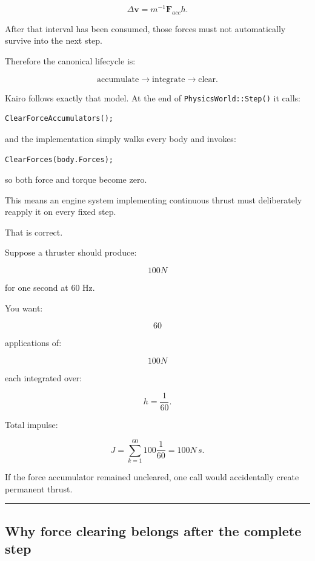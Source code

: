 \[
\Delta\mathbf v
=
m^{-1}\mathbf F_{acc}h.
\]

After that interval has been consumed, those forces must not automatically survive into the next step.

Therefore the canonical lifecycle is:

\[
\boxed{
\text{accumulate}
\rightarrow
\text{integrate}
\rightarrow
\text{clear}.
}
\]

Kairo follows exactly that model. At the end of \texttt{PhysicsWorld::Step()} it calls:

\begin{verbatim}
ClearForceAccumulators();
\end{verbatim}

and the implementation simply walks every body and invokes:

\begin{verbatim}
ClearForces(body.Forces);
\end{verbatim}

so both force and torque become zero.

This means an engine system implementing continuous thrust must deliberately reapply it on every fixed step.

That is correct.

Suppose a thruster should produce:

\[
100N
\]

for one second at 60 Hz.

You want:

\[
60
\]

applications of:

\[
100N
\]

each integrated over:

\[
h=\frac1{60}.
\]

Total impulse:

\[
J
=
\sum_{k=1}^{60}
100\frac1{60}
=
100N\,s.
\]

If the force accumulator remained uncleared, one call would accidentally create permanent thrust.

\begin{center}\rule{0.5\linewidth}{0.5pt}\end{center}

\subsection{Why force clearing belongs after the complete step}\label{06-engine-ii-ch038-why-force-clearing-belongs-after-the-complete-step}

